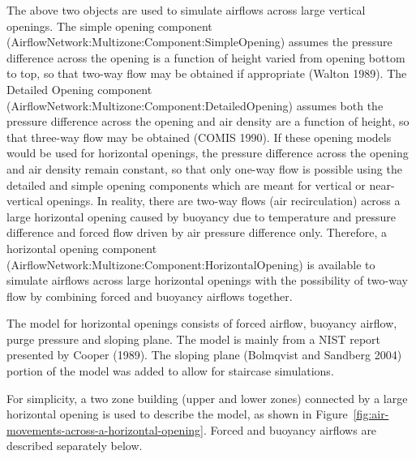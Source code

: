 The above two objects are used to simulate airflows across large vertical openings. The simple opening component (AirflowNetwork:Multizone:Component:SimpleOpening) assumes the pressure difference across the opening is a function of height varied from opening bottom to top, so that two-way flow may be obtained if appropriate (Walton 1989). The Detailed Opening component (AirflowNetwork:Multizone:Component:DetailedOpening) assumes both the pressure difference across the opening and air density are a function of height, so that three-way flow may be obtained (COMIS 1990). If these opening models would be used for horizontal openings, the pressure difference across the opening and air density remain constant, so that only one-way flow is possible using the detailed and simple opening components which are meant for vertical or near-vertical openings. In reality, there are two-way flows (air recirculation) across a large horizontal opening caused by buoyancy due to temperature and pressure difference and forced flow driven by air pressure difference only. Therefore, a horizontal opening component (AirflowNetwork:Multizone:Component:HorizontalOpening) is available to simulate airflows across large horizontal openings with the possibility of two-way flow by combining forced and buoyancy airflows together.

The model for horizontal openings consists of forced airflow, buoyancy airflow, purge pressure and sloping plane. The model is mainly from a NIST report presented by Cooper (1989). The sloping plane (Bolmqvist and Sandberg 2004) portion of the model was added to allow for staircase simulations.

For simplicity, a two zone building (upper and lower zones) connected by a large horizontal opening is used to describe the model, as shown in Figure~\ref{fig:air-movements-across-a-horizontal-opening}. Forced and buoyancy airflows are described separately below.

